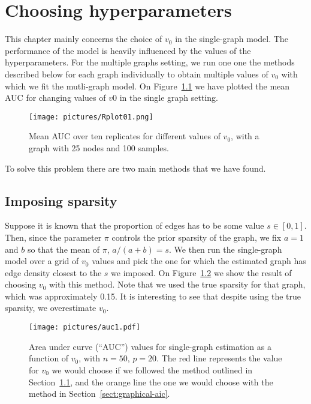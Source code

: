 \documentclass[a4paper, 11pt, oneside]{report}
\newcommand{\1}{\mathds{1}}
\begin{document}
\chapter{Choosing hyperparameters}
This chapter mainly concerns the choice of $v_0$ in the single-graph model.
The performance of the model is heavily influenced by the values of the
hyperparameters.
For the multiple graphs setting, we run one one the methods described below for each graph individually
to obtain multiple values of $v_0$ with which we fit the mutli-graph model.
 On Figure~\ref{fig:mean_auc} we have plotted the mean AUC for
changing values of $v0$ in the single graph setting.
\begin{figure}[ht]
	\centering
	\texttt{[image: pictures/Rplot01.png]}
	\caption{Mean AUC over ten replicates for different values of $v_0$, with a
		graph with 25 nodes and 100 samples.}\label{fig:mean_auc}
\end{figure}
To solve this problem there are two main methods that we have found.

\section{Imposing sparsity}\label{sect:imposing-sparsity}
Suppose it is known that the proportion of edges has to be some value $s \in [0,1]$.
Then, since the parameter $\pi$ controls the prior sparsity of the graph, we 
fix $a = 1$ and $b$ so that the mean of $\pi$, $a / (a+b) = s$. 
We then run the single-graph model over a grid of $v_0$ values and pick the one 
for which the estimated graph has edge density closest to the $s$ we imposed.
On Figure~\ref{fig:auc} we show the result of choosing $v_0$ with this method.
Note that we used the true sparsity for that graph, which was approximately 0.15.
It is interesting to see that despite using the true sparsity, we overestimate
$v_0$.
\begin{figure}[ht]
  \begin{center}
    \texttt{[image: pictures/auc1.pdf]}
  \end{center}
  \caption{Area under curve (``AUC'') values for single-graph estimation as a function of $v_0$, with $n=50$, $p=20$.
    The red line represents the value for $v_0$ we would choose if we followed the method outlined in Section~\ref{sect:imposing-sparsity},
    and the orange line the one we would choose with the method in Section~\ref{sect:graphical-aic}.
}
  \label{fig:auc}
\end{figure}
\end{document}
